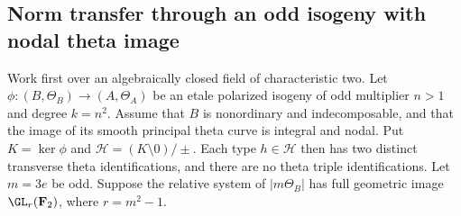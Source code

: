 \subsection{Norm transfer through an odd isogeny with nodal theta image}
\label{subsec:good-theta-norm-transfer-candidate}

Work first over an algebraically closed field of characteristic two.
Let $\phi:(B,\Theta_B)\to(A,\Theta_A)$ be an etale polarized
isogeny of odd multiplier $n>1$ and degree $k=n^2$. Assume that
$B$ is nonordinary and indecomposable, and that the image of its
smooth principal theta curve is integral and nodal. Put
$K=\ker\phi$ and $\mathcal H=(K\setminus0)/\pm$.
Each type $h\in\mathcal H$ then has two distinct transverse
theta identifications, and there are no theta triple identifications.
Let $m=3e$ be odd. Suppose the relative system of $|m\Theta_B|$
has full geometric image $\GL_r(\mathbf F_2)$, where $r=m^2-1$.

